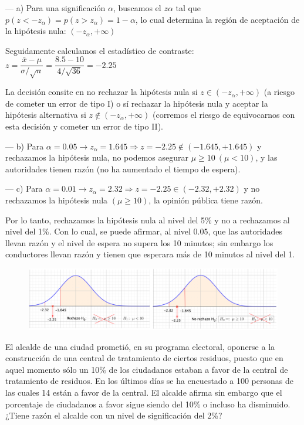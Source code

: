 --- a) Para una significación $\alpha$, buscamos el $z\alpha$ tal que $p(z<-z_\alpha)=p(z>z_\alpha)=1-\alpha$, lo cual determina la región de aceptación de la hipótesis nula: $(-z_\alpha,+\infty)$

Seguidamente calculamos el estadístico de contraste: $z=\dfrac{\bar x-\mu}{\sigma/\sqrt{n}}=\dfrac{8.5-10}{4/\sqrt{36}}=-2.25$

La decisión consite en no rechazar la hipótesis nula si $z\in (-z_\alpha,+\infty)$ (a riesgo de cometer un error de tipo I) o sí rechazar la hipótesis nula y aceptar la hipótesis alternativa si $z\notin (-z_\alpha,+\infty)$ (corremos el riesgo de equivocarnos con esta decisión y cometer un error de tipo II).

--- b) Para $\alpha=0.05 \to z_\alpha=1.645 \Rightarrow z=-2.25 \notin (-1.645,+1.645)$ y rechazamos la hipótesis nula, no podemos asegurar $\mu \ge 10 \ (\mu<10)$, y las autoridades tienen razón (no ha aumentado el tiempo de espera).

--- c) Para $\alpha=0.01 \to z_\alpha=2.32 \Rightarrow z=-2.25 \in (-2.32,+2.32)$ y no rechazamos la hipótesis nula $(\mu \ge 10)$, la opinión pública tiene razón.

Por lo tanto, rechazamos la hipótesis nula al nivel del 5\% y no a rechazamos al nivel del 1\%. Con lo cual, se puede afirmar, al nivel 0.05, que las autoridades llevan razón y el nivel de espera no supera los 10 minutos; sin embargo los conductores llevan razón y tienen que esperara más de 10 minutos al nivel del 1.%

\begin{figure}[H]
	\centering
	\includegraphics[width=1\textwidth]{imagenes/imagenes06/T06IM06.png}
	\end{figure}
	
	
\vspace{4mm}
\begin{ejemplo}
\begin{ejer}
	El alcalde de una ciudad prometió, en su programa electoral, oponerse a la construcción de una central de tratamiento de ciertos residuos, puesto que en aquel momento sólo un 10\% de los ciudadanos estaban a favor de la central de tratamiento de residuos. En los últimos días se ha encuestado a 100 personas de las cuales 14 están a favor de la central. El alcalde afirma sin embargo que el porcentaje de ciudadanos a favor sigue siendo del 10\% o incluso ha disminuido. ¿Tiene razón el alcalde con un nivel de significación del 2\%?
\end{ejer}
\end{ejemplo}

